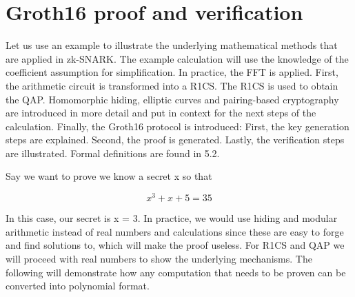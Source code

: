 \section{Groth16 proof and verification}
Let us use an example to illustrate the underlying mathematical methods that are applied in zk-SNARK. The example calculation will use the knowledge of the coefficient assumption for simplification. In practice, the FFT is applied. First, the arithmetic circuit is transformed into a R1CS. The R1CS is used to obtain the QAP. Homomorphic hiding, elliptic curves and pairing-based cryptography are introduced in more detail and put in context for the next steps of the calculation. Finally, the Groth16 protocol is introduced: First, the key generation steps are explained. Second, the proof is generated. Lastly, the verification steps are illustrated. Formal definitions are found in 5.2.

Say we want to prove we know a secret x so that

\[x^3 + x + 5 = 35\]

In this case, our secret is x = 3.
In practice, we would use hiding and modular arithmetic instead of real numbers and calculations since these are easy to forge and find solutions to, which will make the proof useless. For R1CS and QAP we will proceed with real numbers to show the underlying mechanisms. The following will demonstrate how any computation that needs to be proven can be converted into polynomial format.

